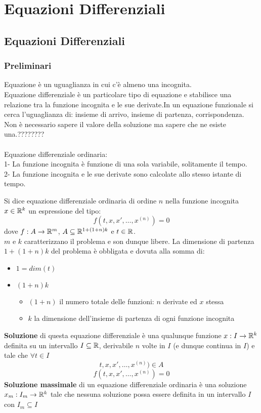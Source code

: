 \part{Equazioni Differenziali}
\chapter{Equazioni Differenziali}
\section{Preliminari}
Equazione è un uguaglianza in cui c'è almeno una incognita.\\
Equazione differenziale è un particolare tipo di equazione e stabilisce una relazione tra la funzione incognita e le sue derivate.In un equazione funzionale si cerca l'uguaglianza di: insieme di arrivo, insieme di partenza, corrispondenza.\\
Non è necessario sapere il valore della soluzione ma sapere che ne esiste una.????????\\\\
Equazione differenziale ordinaria:\\
1- La funzione incognita è funzione di una sola variabile, solitamente il tempo.\\
2- La funzione incognita e le sue derivate sono calcolate allo stesso istante di tempo.\\
\begin{definition}
	\label{def:equaz_diff}
	Si dice equazione differenziale ordinaria di ordine $n$ nella funzione incognita $x\in \mathbb{R}^k$ un espressione del tipo:
	$$f(t,x, x',\ldots,x^{(n)})=0$$
	dove $f:A\to \mathbb{R}^m$, $A\subseteq \mathbb{R}^{1+(1+n)k}$ e $t\in \mathbb{R}$.\\
	$m$ e $k$ caratterizzano il problema e son dunque libere. La dimensione di partenza $1+(1+n)k$ del problema è obbligata e dovuta alla somma di:
	\begin{itemize}
		\item $1 = dim(t)$
		\item $(1+n)k$
		\begin{itemize}
			\item $(1+n)$ il numero totale delle funzioni: $n$ derivate ed $x$ stessa
			\item $k$ la dimensione dell'insieme di partenza di ogni funzione incognita
		\end{itemize}
	\end{itemize}
	\textbf{Soluzione} di questa equazione differenziale è una qualunque funzione $x:I\to \mathbb{R}^k$ definita su un intervallo $I\subseteq \mathbb{R}$, derivabile $n$ volte in $I$ (e dunque continua in $I$) e tale che $\forall t\in I$
	$$t,x, x',\ldots,x^{(n)}) \in A$$
	$$f(t,x, x',\ldots,x^{(n)})=0$$
	\textbf{Soluzione massimale} di un equazione differenziale ordinaria è una soluzione $x_m:I_m\to \mathbb{R}^k$ tale che nessuna soluzione possa essere definita in un intervallo $I$ con $I_m\subseteq I$
\end{definition}
